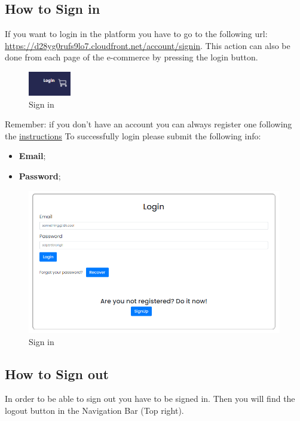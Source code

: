 \subsection{How to Sign in} \label{_signin}
If you want to login in the platform you have to go to the following url: \url{https://d28yg0rufs9lo7.cloudfront.net/account/signin}. This action can also be done from each page of the e-commerce by pressing the login button.
\begin{figure}[H]
    \centering
    \includegraphics[width=5em]{res/images/cliente/loginbutton.png}
    \caption{Sign in}
\end{figure}

Remember: if you don't have an account you can always register one following the \hyperref[_signup]{instructions}
To successfully login please submit the following info: 

\begin{itemize} 
    \item \textbf{Email};
    \item \textbf{Password}; 
\end{itemize}

\begin{figure}[H]
    \centering
    \includegraphics[width=30em]{res/images/cliente/signin.png}
    \caption{Sign in}
\end{figure}


\subsection{How to Sign out} \label{_signout}
In order to be able to sign out you have to be signed in. Then you will find the logout button in the Navigation Bar (Top right).

